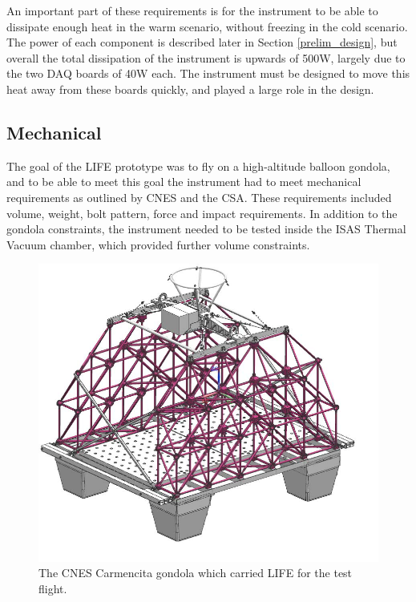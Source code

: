 An important part of these requirements is for the instrument to be able to dissipate enough heat in the warm scenario, without freezing in the cold scenario. The power of each component is described later in Section \ref{prelim_design}, but overall the total dissipation of the instrument is upwards of 500W, largely due to the two DAQ boards of 40W each. The instrument must be designed to move this heat away from these boards quickly, and played a large role in the design.

\subsection{Mechanical}
The goal of the LIFE prototype was to fly on a high-altitude balloon gondola, and to be able to meet this goal the instrument had to meet mechanical requirements as outlined by CNES and the CSA. These requirements included volume, weight, bolt pattern, force and impact requirements. In addition to the gondola constraints, the instrument needed to be tested inside the ISAS Thermal Vacuum chamber, which provided further volume constraints.

\begin{figure}[h]
\centering
  \includegraphics[width=0.7\linewidth]{chap3_images/Carmencita_empty.png}
  \caption{The CNES Carmencita gondola which carried LIFE for the test flight.}
  \label{fig:Carmencita_empty}
\end{figure}

